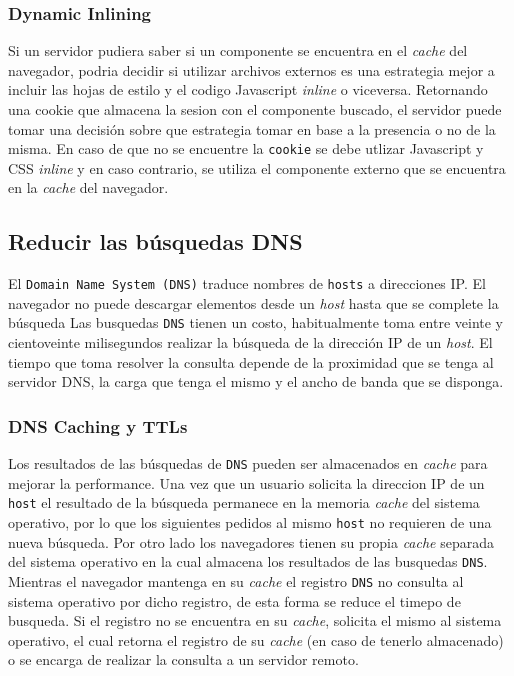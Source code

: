 \documentclass[a4paper,12pt]{report}
\begin{document}
\subsubsection{Dynamic Inlining}

Si un servidor pudiera saber si un componente se encuentra en el \emph{cache} del navegador, podria decidir si utilizar archivos externos es una estrategia mejor
a incluir las hojas de estilo y el codigo Javascript \emph{inline} o viceversa.
Retornando una cookie que almacena la sesion con el componente buscado, el servidor puede tomar una decisión sobre que estrategia tomar en base a la presencia o no de la
misma. En caso de que no se encuentre la \texttt{cookie} se debe utlizar Javascript y CSS \emph{inline} y en caso
contrario, se utiliza el componente externo que se encuentra en la \emph{cache} del navegador.

\subsection{Reducir las búsquedas DNS}

El \texttt{Domain Name System (DNS)} traduce nombres de \texttt{hosts} a direcciones IP. El navegador no puede descargar elementos desde un \emph{host}
hasta que se complete la búsqueda Las busquedas \texttt{DNS} tienen un costo, habitualmente toma entre veinte y cientoveinte milisegundos realizar la búsqueda de la
dirección IP de un \emph{host}. El tiempo que toma resolver la consulta depende de la proximidad que se tenga al servidor DNS, la carga que tenga el mismo y el ancho de banda
que se disponga.

\subsubsection{DNS Caching y TTLs}

Los resultados de las búsquedas de \texttt{DNS} pueden ser almacenados en \emph{cache} para mejorar la performance. Una vez que un usuario solicita la direccion IP de un \texttt{host}
el resultado de la búsqueda permanece en la memoria \emph{cache} del sistema operativo, por lo que los siguientes pedidos al mismo \texttt{host} no requieren de una nueva búsqueda.
Por otro lado los navegadores tienen su propia \emph{cache} separada del sistema operativo en la cual almacena los resultados de las busquedas \texttt{DNS}.
Mientras el navegador mantenga en su \emph{cache} el registro \texttt{DNS} no consulta al sistema operativo por dicho registro, de esta forma se reduce el timepo de busqueda.
Si el registro no se encuentra en su \emph{cache}, solicita el mismo al sistema operativo, el cual retorna el registro de su \emph{cache} (en caso de tenerlo almacenado) o
se encarga de realizar la consulta a un servidor remoto.
\end{document}
